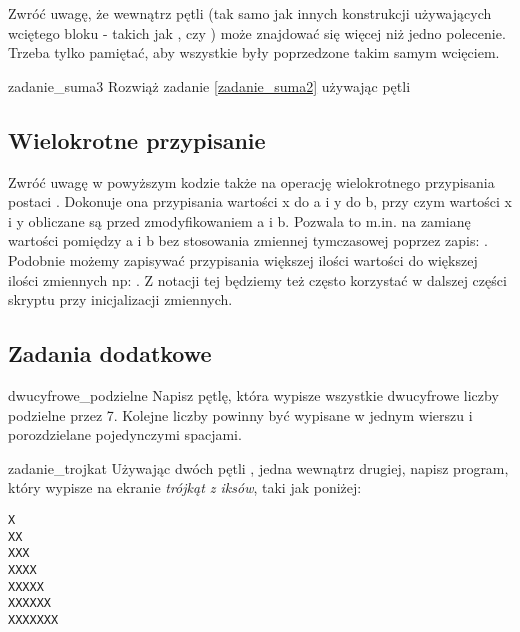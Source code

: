 \documentclass{pdfBooklets}
\begin{document}
Zwróć uwagę, że wewnątrz pętli  (tak samo jak innych konstrukcji używających wciętego bloku - takich jak , czy )
może znajdować się więcej niż jedno polecenie. Trzeba tylko pamiętać, aby wszystkie były poprzedzone takim samym wcięciem.

\begin{Zadanie}{}{zadanie_suma3}
Rozwiąż zadanie \ref{zadanie_suma2} używając pętli 
\end{Zadanie}

\subsection{Wielokrotne przypisanie}

Zwróć uwagę w powyższym kodzie także na operację wielokrotnego przypisania postaci .
Dokonuje ona przypisania wartości x do a i y do b, przy czym wartości x i y obliczane są przed zmodyfikowaniem a i b.
Pozwala to m.in. na zamianę wartości pomiędzy a i b bez stosowania zmiennej tymczasowej poprzez zapis: .
Podobnie możemy zapisywać przypisania większej ilości wartości do większej ilości zmiennych np: .
Z notacji tej będziemy też często korzystać w dalszej części skryptu przy inicjalizacji zmiennych.

\subsection{Zadania dodatkowe}
\begin{Zadanie}{}{dwucyfrowe_podzielne} %
Napisz pętlę, która wypisze wszystkie dwucyfrowe liczby podzielne przez 7.
Kolejne liczby powinny być wypisane w jednym wierszu i porozdzielane pojedynczymi spacjami.
\end{Zadanie}

\begin{Zadanie}{}{zadanie_trojkat}
Używając dwóch pętli , jedna wewnątrz drugiej, napisz program, który wypisze na ekranie
\textit{trójkąt z iksów}, taki jak poniżej:
\begin{Verbatim}
X
XX
XXX
XXXX
XXXXX
XXXXXX
XXXXXXX
\end{Verbatim}
\end{Zadanie}
\end{document}

